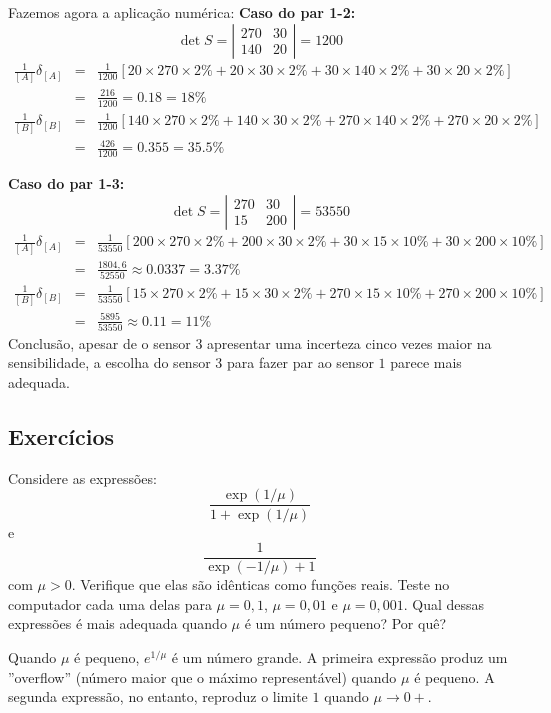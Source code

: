 \begin{resol}
Fazemos agora a aplicação numérica:
{\bf Caso do par 1-2:}
$$\det{S}=\left|\begin{matrix}270&30\\140&20\end{matrix}\right|=1200$$
\begin{eqnarray*}
\frac{1}{[A]}\delta_{[A]}
&=&\frac{1}{1200}\left[20\times 270\times 2\%+20\times 30\times 2\%+30\times 140\times 2\%+30\times 20\times 2\%\right]\\&=&\frac{216}{1200}=0.18=18\%\\
\frac{1}{[B]}\delta_{[B]}
&=&\frac{1}{1200}\left[140\times 270\times 2\%+140\times 30\times 2\%+270\times 140\times 2\%+270\times 20\times 2\%\right]\\&=&\frac{426}{1200}=0.355=35.5\%
\end{eqnarray*}

{\bf Caso do par 1-3:}
$$\det{S}=\left|\begin{array}{cc}270&30\\15&200\end{array}\right|=53550$$
\begin{eqnarray*}
\frac{1}{[A]}\delta_{[A]}
&=&\frac{1}{53550}\left[200\times 270\times 2\%+200\times 30\times 2\%+30\times 15\times 10\%+30\times 200\times 10\%\right]\\&=&\frac{1804,6}{52550}\approx 0.0337=3.37\%\\
\frac{1}{[B]}\delta_{[B]}
&=&\frac{1}{53550}\left[15\times 270\times 2\%+15\times 30\times 2\%+270\times 15\times 10\%+270\times 200\times 10\%\right]\\&=&	\frac{5895}{53550}\approx   0.11=11\%
\end{eqnarray*}
Conclusão, apesar de o sensor $3$ apresentar uma incerteza cinco vezes maior na sensibilidade, a escolha do sensor $3$ para fazer par ao sensor $1$ parece mais adequada.    
\end{resol}


\subsection*{Exercícios}

\begin{exer} Considere as expressões:
  \begin{equation*}
    \frac{\exp(1/\mu)}{1+\exp(1/\mu)}  
  \end{equation*}
e
\begin{equation*}
  \frac{1}{\exp(-1/\mu)+1}
\end{equation*}
com $\mu>0$. Verifique que elas são idênticas como funções reais. Teste no computador cada uma delas para $\mu=0,1$, $\mu=0,01$ e $\mu=0,001$. Qual dessas expressões é mais adequada quando $\mu$ é um número pequeno? Por quê?
\end{exer}
\begin{resp}
  Quando $\mu$ é pequeno, $e^{1/\mu}$ é um número grande. A primeira expressão produz um ''overflow'' (número maior que o máximo representável) quando $\mu$ é pequeno. A segunda expressão, no entanto, reproduz o limite $1$ quando $\mu\to 0+$.
\end{resp}

